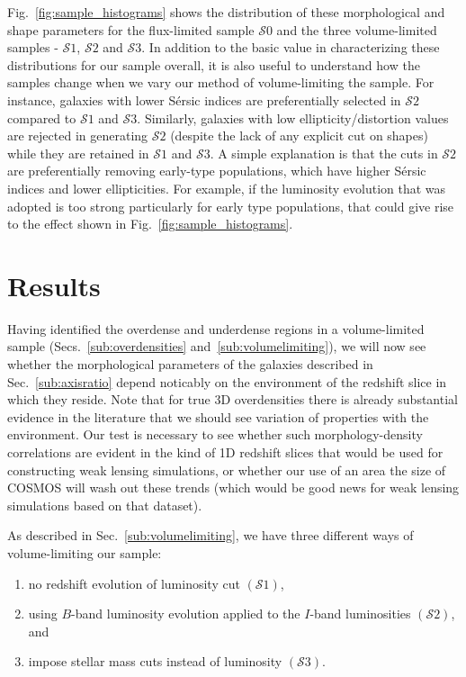 \documentclass[twocolumn,useAMS,usenatbib]{mn2e}
\newcommand{\sersic}{S\'{e}rsic }
\newcommand{\s}{\ensuremath{\mathcal{S}}}
\begin{document}
Fig.~\ref{fig:sample_histograms} shows the distribution of these morphological and shape parameters for the flux-limited sample \s$0$ and the three
volume-limited samples - \s$1$, \s$2$ and \s$3$. In addition to the
basic value in characterizing these distributions for our sample
overall, it is also useful to understand how the samples change when
we vary our method of volume-limiting the sample.
For instance, galaxies with lower \sersic indices are preferentially
selected in \s$2$ compared to \s$1$ and \s$3$. Similarly, galaxies
with low ellipticity/distortion values 
are rejected in generating \s$2$ (despite the lack of any explicit
cut on shapes) while they are retained in
\s$1$ and \s$3$.  A simple explanation is that the cuts in \s$2$ are
preferentially removing early-type populations, which have higher
\sersic indices and lower ellipticities.  For example, if the
luminosity evolution that was adopted is too strong particularly for
early type populations, that could give rise to the effect shown in
Fig.~\ref{fig:sample_histograms}.

\section{Results}
\label{S:results}

Having identified the overdense and underdense regions in a
volume-limited sample (Secs.~\ref{sub:overdensities}
and~\ref{sub:volumelimiting}), we will now see whether the morphological
parameters of the galaxies described in Sec.~\ref{sub:axisratio}
depend noticably on the environment of the redshift slice in which
they reside. Note that for true 3D overdensities there is already
substantial evidence in the literature that we should see variation of
properties with the environment.  Our test is necessary to see
whether such morphology-density correlations are evident in the kind
of 1D redshift slices that would be used for constructing weak lensing
simulations, or whether our use of an area the size of COSMOS will
wash out these trends (which would be good news for weak lensing
simulations based on that dataset).

As described in Sec.~\ref{sub:volumelimiting}, we have three different ways of volume-limiting our sample:
\begin{enumerate}
 \item no redshift evolution of luminosity cut $(\s1)$,
 \item using $B$-band luminosity evolution applied to the $I$-band
   luminosities $(\s2)$, and
 \item impose stellar mass cuts instead of luminosity $(\s3)$.
\end{enumerate}
\end{document}
